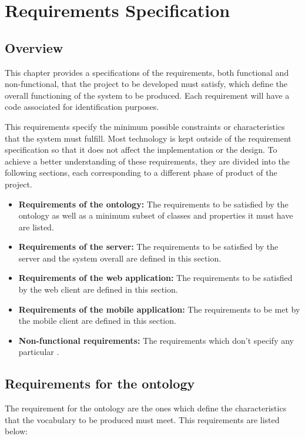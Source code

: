 \chapter{Requirements Specification}\label{ch:requirements}

\section{Overview}

This chapter provides a specifications of the requirements, both functional and non-functional, that the project to be developed must satisfy, which define the overall functioning of the system to be produced. Each requirement will have a code associated for identification purposes.

This requirements specify the minimum possible constraints or characteristics that the system must fulfill. Most technology is kept outside of the requirement specification so that it does not affect the implementation or the design. To achieve a better understanding of these requirements, they are divided into the following sections, each corresponding to a different phase of product of the project.

\begin{itemize}
\item \textbf{Requirements of the ontology:} The requirements to be satisfied by the ontology as well as a minimum subset of classes and properties it must have are listed.
\item \textbf{Requirements of the server:} The requirements to be satisfied by the server and the system overall are defined in this section.
\item \textbf{Requirements of the web application:} The requirements to be satisfied by the web client are defined in this section.
\item \textbf{Requirements of the mobile application:} The requirements to be met by the mobile client are defined in this section.
\item \textbf{Non-functional requirements:} The requirements which don't specify any particular .
\end{itemize}

\section{Requirements for the ontology}

The requirement for the ontology are the ones which define the characteristics that the vocabulary to be produced must meet. This requirements are listed below:

